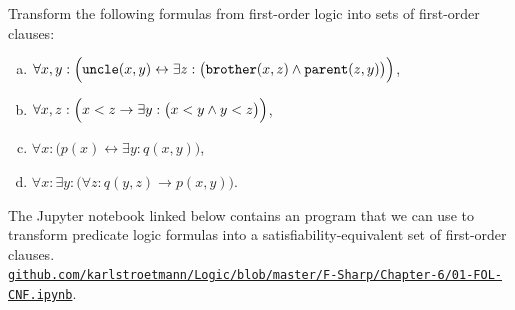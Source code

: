 \exerciseEng
Transform the following formulas from first-order logic into sets of first-order clauses:
\begin{enumerate}[(a)]
\item $\forall x, y: \Bigl(\mathtt{uncle}(x,y) \leftrightarrow
       \exists z: \bigl(\mathtt{brother}(x,z) \wedge \mathtt{parent}(z,y)\bigr)\Bigr)$,
\item $\forall x, z: \Bigl(x < z \rightarrow \exists y: \bigl(x < y \wedge y < z\bigr)\Bigr)$,
\item $\forall x: \bigl(p(x) \leftrightarrow \exists y: q(x,y) \bigr)$, 
\item $\forall x: \exists y: \bigl(\forall z:q(y,z) \rightarrow p(x,y)\bigr)$. \eox
\end{enumerate}%
\vspace*{-0.1cm}

\noindent
The Jupyter notebook linked below contains an \Fsharp{} program that we can use to transform predicate
logic formulas into a satisfiability-equivalent set of first-order clauses. 
\\[0.2cm]
\href{https://github.com/karlstroetmann/Logic/blob/master/F-Sharp/Chapter-6/01-FOL-CNF.ipynb}{\small\texttt{github.com/karlstroetmann/Logic/blob/master/F-Sharp/Chapter-6/01-FOL-CNF.ipynb}}.
\vspace*{0.2cm}

